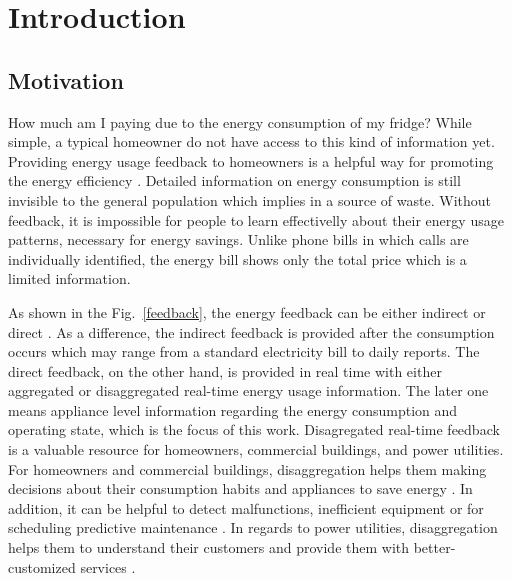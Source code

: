 \pagestyle{headings}

\chapter{Introduction}

\setcounter{page}{8}

\section{Motivation}

How much am I paying due to the energy consumption of my fridge? While simple, a typical homeowner do not have access to this kind of information yet. Providing energy usage feedback to homeowners is a helpful way for promoting the energy efficiency \cite{eci}. Detailed information on energy consumption is still invisible to the general population which implies in a source of waste. Without feedback, it is impossible for people to learn effectivelly about their energy usage patterns, necessary for energy savings. Unlike phone bills in which calls are individually identified, the energy bill shows only the total price which is a limited information. 

As shown in the Fig.~\ref{feedback}, the energy feedback can be either indirect or direct \cite{epri}. As a difference, the indirect feedback is provided after the consumption occurs which may range from a standard electricity bill to daily reports. The direct feedback, on the other hand, is provided in real time with either aggregated or disaggregated real-time energy usage information. The later one means appliance level information regarding the energy consumption and operating state, which is the focus of this work. Disagregated real-time feedback is a valuable resource for homeowners, commercial buildings, and power utilities. For homeowners and commercial buildings, disaggregation helps them making decisions about their consumption habits and appliances to save energy \cite{CarrieArmel2013213}. In addition, it can be helpful to detect malfunctions, inefficient equipment or for scheduling predictive maintenance \cite{eunilm2016}. In regards to power utilities, disaggregation helps them to understand their customers and provide them with better-customized services \cite{eunilm2016-2}. 

